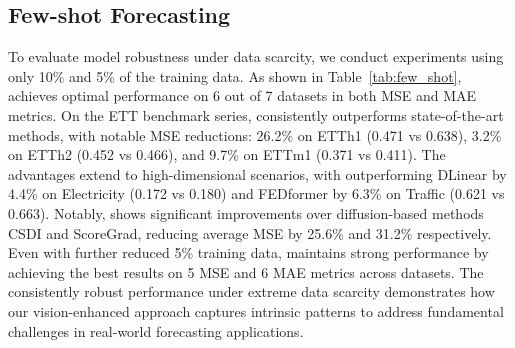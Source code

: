 \subsection{Few-shot Forecasting}
To evaluate model robustness under data scarcity, we conduct experiments using only 10\% and 5\% of the training data. As shown in Table~\ref{tab:few_shot}, \model achieves optimal performance on 6 out of 7 datasets in both MSE and MAE metrics. On the ETT benchmark series, \model consistently outperforms state-of-the-art methods, with notable MSE reductions: 26.2\% on ETTh1 (0.471 vs 0.638), 3.2\% on ETTh2 (0.452 vs 0.466), and 9.7\% on ETTm1 (0.371 vs 0.411). The advantages extend to high-dimensional scenarios, with \model outperforming DLinear by 4.4\% on Electricity (0.172 vs 0.180) and FEDformer by 6.3\% on Traffic (0.621 vs 0.663). Notably, \model shows significant improvements over diffusion-based methods CSDI and ScoreGrad, reducing average MSE by 25.6\% and 31.2\% respectively. Even with further reduced 5\% training data, \model maintains strong performance by achieving the best results on 5 MSE and 6 MAE metrics across datasets. The consistently robust performance under extreme data scarcity demonstrates how our vision-enhanced approach captures intrinsic patterns to address fundamental challenges in real-world forecasting applications.

